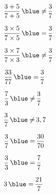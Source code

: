     \begin{colenumerate}{3}
      \item $\dfrac{3+5}{7+5} \, {\blue \neq} \, \dfrac{3}{7}$ \medskip
      \item $\dfrac{3\times5}{7\times5} \, {\blue =} \, \dfrac{3}{7}$ \medskip
      \item $\dfrac{3\times7}{7\times3} \, {\blue \neq} \, \dfrac{3}{7}$ \medskip
      \item $\dfrac{33}{77} \, {\blue =} \,  \dfrac{3}{7}$
      \item $\dfrac{7}{3} \, {\blue \neq} \, \dfrac{3}{7}$
      \item $\dfrac{3}{7} \, {\blue \neq} \, 3,7$
      \item $\dfrac{3}{7} \, {\blue =} \, \dfrac{30}{70}$
      \item $\dfrac{3}{3} \, {\blue =} \, \dfrac{7}{7}$
      \item $3 \, {\blue =} \, \dfrac{21}{7}$
   \end{colenumerate}
